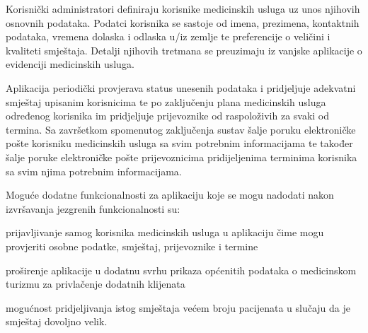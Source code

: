 		Korisnički administratori definiraju korisnike medicinskih usluga uz unos njihovih osnovnih podataka. Podatci korisnika se sastoje od imena, prezimena, kontaktnih podataka, vremena dolaska i odlaska u/iz zemlje te preferencije o veličini i kvaliteti smještaja. Detalji njihovih tretmana se preuzimaju iz vanjske aplikacije o evidenciji medicinskih usluga.

		\break
		Aplikacija periodički provjerava status unesenih podataka i pridjeljuje adekvatni smještaj upisanim korisnicima te po zaključenju plana medicinskih usluga određenog korisnika im pridjeljuje prijevoznike od raspoloživih za svaki od termina. Sa završetkom spomenutog zaključenja sustav šalje poruku elektroničke pošte korisniku medicinskih usluga sa svim potrebnim informacijama te također šalje poruke elektroničke pošte prijevoznicima pridijeljenima terminima korisnika sa svim njima potrebnim informacijama.
		
		\medskip
		Moguće dodatne funkcionalnosti za aplikaciju koje se mogu nadodati nakon izvršavanja jezgrenih funkcionalnosti su:
		\begin{packed_item}
			\item  prijavljivanje samog korisnika medicinskih usluga u aplikaciju čime mogu provjeriti osobne podatke, smještaj, prijevoznike i termine
			\item  proširenje aplikacije u dodatnu svrhu prikaza općenitih podataka o medicinskom turizmu za privlačenje dodatnih klijenata
			\item  mogućnost pridjeljivanja istog smještaja većem broju pacijenata u slučaju da je smještaj dovoljno velik.
		\end{packed_item}
		\break

